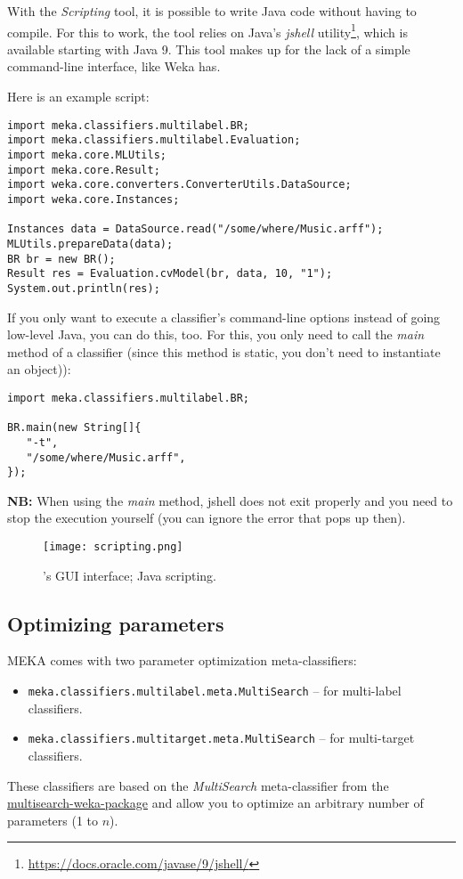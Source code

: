 \documentclass[11pt]{article}
\begin{document}
With the \textit{Scripting} tool, it is possible to write Java code without having
to compile. For this to work, the tool relies on Java's \textit{jshell} utility\footnote{\url{https://docs.oracle.com/javase/9/jshell/}{}},
which is available starting with Java 9. This tool makes up for the lack of a
simple command-line interface, like Weka has.

\noindent Here is an example script:
{\scriptsize
\begin{verbatim}
import meka.classifiers.multilabel.BR;
import meka.classifiers.multilabel.Evaluation;
import meka.core.MLUtils;
import meka.core.Result;
import weka.core.converters.ConverterUtils.DataSource;
import weka.core.Instances;

Instances data = DataSource.read("/some/where/Music.arff");
MLUtils.prepareData(data);
BR br = new BR();
Result res = Evaluation.cvModel(br, data, 10, "1");
System.out.println(res);
\end{verbatim}}

\noindent If you only want to execute a classifier's command-line options
instead of going low-level Java, you can do this, too. For this, you only
need to call the \textit{main} method of a classifier (since this method is
static, you don't need to instantiate an object)):
{\scriptsize
\begin{verbatim}
import meka.classifiers.multilabel.BR;

BR.main(new String[]{
   "-t",
   "/some/where/Music.arff",
});
\end{verbatim}}
\noindent \textbf{NB:} When using the \textit{main} method, jshell does not
exit properly and you need to stop the execution yourself (you can ignore the
error that pops up then).

\begin{figure}
	\centering
	\texttt{[image: scripting.png]}
	\caption{\label{screen:graphs} 's GUI interface; Java scripting.}
\end{figure}



\subsection{Optimizing parameters}
MEKA comes with two parameter optimization meta-classifiers:
\begin{itemize}
  \item \texttt{meka.classifiers.multilabel.meta.MultiSearch} -- for multi-label
  classifiers.
  \item \texttt{meka.classifiers.multitarget.meta.MultiSearch} -- for multi-target
  classifiers.
\end{itemize}
These classifiers are based on the \textit{MultiSearch} meta-classifier from
the \href{https://github.com/fracpete/multisearch-weka-package}{multisearch-weka-package}
and allow you to optimize an arbitrary number of parameters (1 to $n$).
\end{document}
